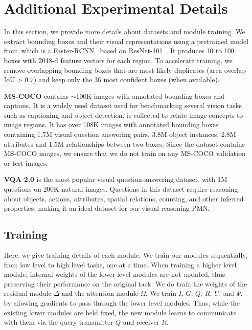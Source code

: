 \documentclass{article}
\begin{document}
\newpage\section{Additional Experimental Details}
In this section, we provide more details about datasets and module training.
We extract bounding boxes and their visual representations using a pretrained model from~\citet{anderson17}which is a Faster-RCNN~\citep{ren15} based on ResNet-101~\citep{he16}.
It produces 10 to 100 boxes with 2048-d feature vectors for each region.
To accelerate training, we remove overlapping bounding boxes that are most likely duplicates (area overlap IoU > 0.7) and keep only the 36 most confident boxes (when available).

\textbf{MS-COCO}
contains $\sim$100K images with annotated bounding boxes and captions.
It is a widely used dataset used  for benchmarking several vision tasks such as captioning and object detection.
is collected to relate image concepts to image regions.
It has over 108K images with annotated bounding boxes containing 1.7M visual question answering pairs, 3.8M object instances, 2.8M attributes and 1.5M relationships between two boxes.
Since the dataset contains MS-COCO images, we ensure that we do not train on any MS-COCO validation or test images.

\textbf{VQA 2.0}
is the most popular visual question-answering dataset, with 1M questions on 200K natural images.
Questions in this dataset require reasoning about objects, actions, attributes, spatial relations, counting, and other inferred properties; making it
an ideal dataset for our visual-reasoning PMN.

\subsection{Training}\label{sec:appendix_training}
Here, we give training details of each module.
We train our modules sequentially, from low level to high level tasks, one at a time.
When training a higher level module, internal weights of the lower level modules are not updated, thus preserving their performance on the original task. We do train the weights of the residual module $\Delta$ and the attention module $\Omega$.
We train $I$, $G$, $Q$, $R$, $U$, %
and $\Psi$, by allowing gradients to pass through the lower level modules.
Thus, while the existing lower modules are held fixed, the new module learns to communicate with them via the query transmitter $Q$ and receiver $R$.
\end{document}
